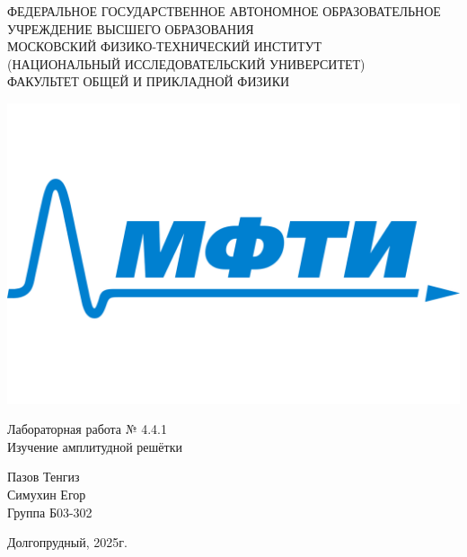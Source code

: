 \documentclass[a4paper,12pt]{article} %
\begin{document}
\begin{center}
	\footnotesize{ФЕДЕРАЛЬНОЕ ГОСУДАРСТВЕННОЕ АВТОНОМНОЕ ОБРАЗОВАТЕЛЬНОЕ 			УЧРЕЖДЕНИЕ ВЫСШЕГО ОБРАЗОВАНИЯ}\\
	\footnotesize{МОСКОВСКИЙ ФИЗИКО-ТЕХНИЧЕСКИЙ ИНСТИТУТ\\(НАЦИОНАЛЬНЫЙ 			ИССЛЕДОВАТЕЛЬСКИЙ УНИВЕРСИТЕТ)}\\
	\footnotesize{ФАКУЛЬТЕТ ОБЩЕЙ И ПРИКЛАДНОЙ ФИЗИКИ\\}
	\hfill \break
	\hfill \break
	\hfill \break
	\hfill \break
\end{center}


\begin{center}
    \includegraphics[scale=0.25]{mipt.jpg}
\end{center}
\begin{center}   
    \hfill \break
	\hfill \break
	\hfill \break
	\large{Лабораторная работа № 4.4.1\\ \hfill \break\Large{Изучение амплитудной решётки}}\\
	\hfill \break
	\hfill \break
	\hfill \break
	\hfill \break
	\begin{flushright}
		Пазов Тенгиз\\
		Симухин Егор\\
		Группа Б03-302
	\end{flushright}
	\hfill \break
	\hfill \break
	\hfill \break
\end{center}
\hfill \break
\hfill \break
\hfill \break
\hfill \break
\begin{center}
	Долгопрудный, 2025г.
\end{center}
\thispagestyle{empty}

\newpage
\end{document}
